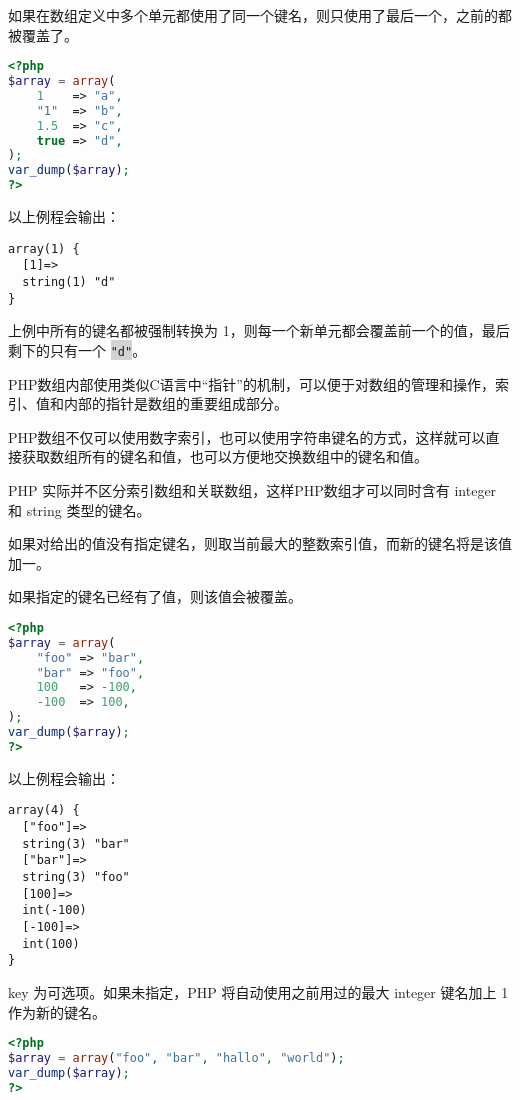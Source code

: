 如果在数组定义中多个单元都使用了同一个键名，则只使用了最后一个，之前的都被覆盖了。

\begin{lstlisting}[language=PHP]
<?php
$array = array(
    1    => "a",
    "1"  => "b",
    1.5  => "c",
    true => "d",
);
var_dump($array);
?>
\end{lstlisting}

以上例程会输出：


\begin{verbatim}
array(1) {
  [1]=>
  string(1) "d"
}
\end{verbatim}

上例中所有的键名都被强制转换为 1，则每一个新单元都会覆盖前一个的值，最后剩下的只有一个 \colorbox{lightgray}{\texttt{"d"}}。

PHP数组内部使用类似C语言中“指针”的机制，可以便于对数组的管理和操作，索引、值和内部的指针是数组的重要组成部分。

PHP数组不仅可以使用数字索引，也可以使用字符串键名的方式，这样就可以直接获取数组所有的键名和值，也可以方便地交换数组中的键名和值。

PHP 实际并不区分索引数组和关联数组，这样PHP数组才可以同时含有 integer 和 string 类型的键名。

\begin{compactitem}
\item 如果对给出的值没有指定键名，则取当前最大的整数索引值，而新的键名将是该值加一。
\item 如果指定的键名已经有了值，则该值会被覆盖。
\end{compactitem}



\begin{lstlisting}[language=PHP]
<?php
$array = array(
    "foo" => "bar",
    "bar" => "foo",
    100   => -100,
    -100  => 100,
);
var_dump($array);
?>
\end{lstlisting}

以上例程会输出：


\begin{verbatim}
array(4) {
  ["foo"]=>
  string(3) "bar"
  ["bar"]=>
  string(3) "foo"
  [100]=>
  int(-100)
  [-100]=>
  int(100)
}
\end{verbatim}

key 为可选项。如果未指定，PHP 将自动使用之前用过的最大 integer 键名加上 1 作为新的键名。

\begin{lstlisting}[language=PHP]
<?php
$array = array("foo", "bar", "hallo", "world");
var_dump($array);
?>
\end{lstlisting}

